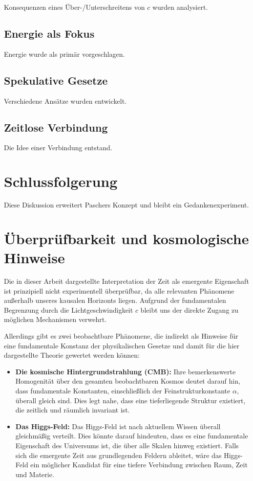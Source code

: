 \documentclass{article}
\begin{document}
	Konsequenzen eines Über-/Unterschreitens von \( c \) wurden analysiert.
	
	\subsection{Energie als Fokus}
	
	Energie wurde als primär vorgeschlagen.
	
	\subsection{Spekulative Gesetze}
	
	Verschiedene Ansätze wurden entwickelt.
	
	\subsection{Zeitlose Verbindung}
	
	Die Idee einer Verbindung entstand.
	
	\section{Schlussfolgerung}
	
	Diese Diskussion erweitert Paschers Konzept und bleibt ein Gedankenexperiment.
	
	\section{Überprüfbarkeit und kosmologische Hinweise}
	
	Die in dieser Arbeit dargestellte Interpretation der Zeit als emergente Eigenschaft ist prinzipiell nicht experimentell überprüfbar, da alle relevanten Phänomene außerhalb unseres kausalen Horizonts liegen. Aufgrund der fundamentalen Begrenzung durch die Lichtgeschwindigkeit \( c \) bleibt uns der direkte Zugang zu möglichen Mechanismen verwehrt.
	
	Allerdings gibt es zwei beobachtbare Phänomene, die indirekt als Hinweise für eine fundamentale Konstanz der physikalischen Gesetze und damit für die hier dargestellte Theorie gewertet werden können:
	
	\begin{itemize}
		\item \textbf{Die kosmische Hintergrundstrahlung (CMB):} Ihre bemerkenswerte Homogenität über den gesamten beobachtbaren Kosmos deutet darauf hin, dass fundamentale Konstanten, einschließlich der Feinstrukturkonstante \( \alpha \), überall gleich sind. Dies legt nahe, dass eine tieferliegende Struktur existiert, die zeitlich und räumlich invariant ist.
		
		\item \textbf{Das Higgs-Feld:} Das Higgs-Feld ist nach aktuellem Wissen überall gleichmäßig verteilt. Dies könnte darauf hindeuten, dass es eine fundamentale Eigenschaft des Universums ist, die über alle Skalen hinweg existiert. Falls sich die emergente Zeit aus grundlegenden Feldern ableitet, wäre das Higgs-Feld ein möglicher Kandidat für eine tiefere Verbindung zwischen Raum, Zeit und Materie.
	\end{itemize}
	
\end{document}
